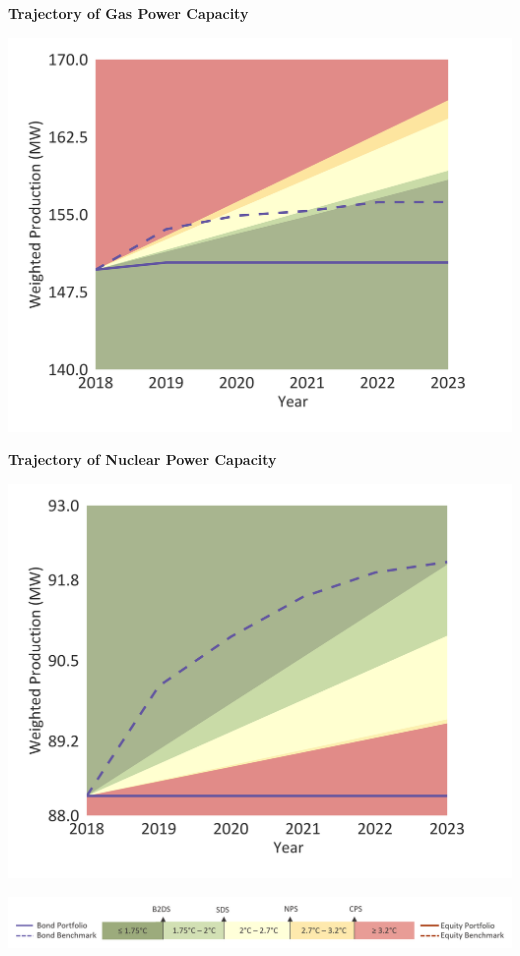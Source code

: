 \documentclass[10pt,table,a4]{article}\usepackage[]{graphicx}\usepackage[]{color}
\begin{document}
	\begin{minipage}[t]{.49\textwidth}
		\textbf{Trajectory of Gas Power Capacity }
		
		\includegraphics[trim = {0 0cm 0 0},width=1\linewidth]{CAFigures/Fig09}
		
		\textbf{Trajectory of Nuclear Power Capacity }
		
		\includegraphics[trim = {0 0cm 0 0},width=1\linewidth]{CAFigures/Fig10}
		
	\end{minipage}
	
	\vspace{-0.6cm}
	\begin{center}
		\includegraphics[trim = {0 0cm 0 0},width=.9\linewidth]{ReportGraphics/246Legend.png}
	\end{center}
	
\end{document}

